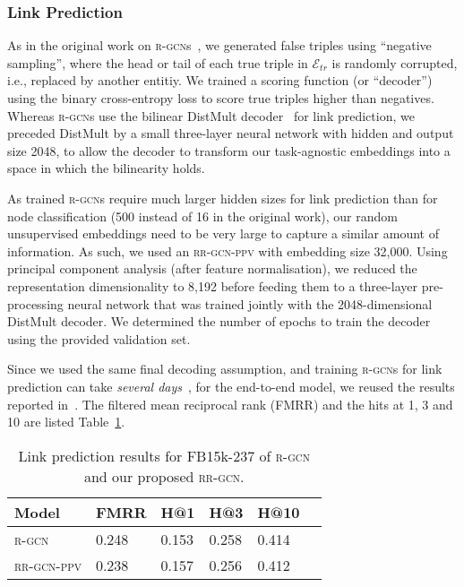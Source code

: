\documentclass{llncs}
\begin{document}
\subsubsection{Link Prediction}
As in the original work on \textsc{r-gcn}s~\cite{schlichtkrull2018modeling}, we generated false triples using ``negative sampling'', where the head or tail of each true triple in $\mathcal{E}_{tr}$ is randomly corrupted, i.e., replaced by another entitiy. We trained a scoring function (or ``decoder'') using the binary cross-entropy loss to score true triples higher than negatives. Whereas \textsc{r-gcn}s use the bilinear DistMult decoder~\cite{schlichtkrull2018modeling,yang2015embedding} for link prediction, we preceded DistMult by a small three-layer neural network with hidden and output size 2048, to allow the decoder to transform our task-agnostic embeddings into a space in which the bilinearity holds. 

As trained \textsc{r-gcn}s require much larger hidden sizes for link prediction than for node classification (500 instead of 16 in the original work), our random unsupervised embeddings need to be very large to capture a similar amount of information. As such, we used an \textsc{rr-gcn-ppv} with embedding size 32,000. Using principal component analysis (after feature normalisation), we reduced the representation dimensionality to 8,192 before feeding them to a three-layer pre-processing neural network that was trained jointly with the 2048-dimensional DistMult decoder. We determined the number of epochs to train the decoder using the provided validation set.

Since we used the same final decoding assumption, and training \textsc{r-gcn}s for link prediction can take \textit{several days}~\cite{thanapalasingam2021relational}, for the end-to-end model, we reused the results reported in~\cite{schlichtkrull2018modeling}. The filtered mean reciprocal rank (FMRR) and the hits at 1, 3 and 10 are listed Table~\ref{tab:linkpred}. 

\begin{table}[t]
\begin{center}
\begin{tabular}{llllll}\toprule
 \textbf{Model}      &  \textbf{FMRR} &  \textbf{H@1} &  \textbf{H@3} & \textbf{H@10}\\\midrule
\textsc{r-gcn} &  0.248 & 0.153 & 0.258 & 0.414\\
\textsc{rr-gcn-ppv} & 0.238 & 0.157 & 0.256 & 0.412  \\\bottomrule
\end{tabular}
\end{center}
\caption{Link prediction results for FB15k-237 of \textsc{r-gcn} and our proposed \textsc{rr-gcn}.\label{tab:linkpred}}
\end{table}
\end{document}
